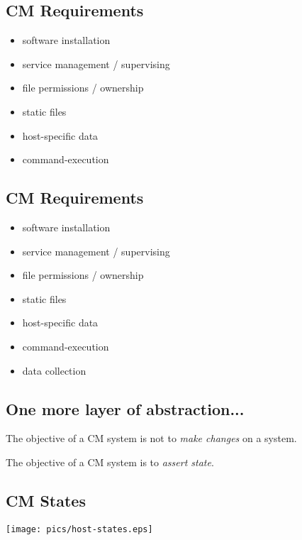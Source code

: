 \documentclass[xga]{xdvislides}
\begin{document}
\subsection{CM Requirements}
\begin{itemize}
	\item software installation
	\item service management / supervising
	\item file permissions / ownership
	\item static files
	\item host-specific data
\end{itemize}
\vspace{.25in}
\begin{itemize}
	\item command-execution
\end{itemize}

\subsection{CM Requirements}
\begin{itemize}
	\item software installation
	\item service management / supervising
	\item file permissions / ownership
	\item static files
	\item host-specific data
\end{itemize}
\vspace{.25in}
\begin{itemize}
	\item command-execution
	\item data collection
\end{itemize}

\subsection{One more layer of abstraction...}
\vspace{.5in}

The objective of a CM system is not to {\em make
changes} on a system. \\

\vspace{.5in}

The objective of a CM system is to {\em assert state}.

\subsection{CM States}
\vspace*{\fill}
\begin{center}
	\texttt{[image: pics/host-states.eps]} \\
\end{center}
\vspace*{\fill}
\end{document}
